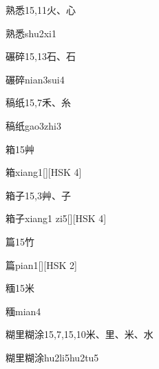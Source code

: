 \begin{entry}{熟悉}{15,11}{⽕、⼼}
  \begin{phonetics}{熟悉}{shu2xi1}
  \end{phonetics}
\end{entry}

\begin{entry}{碾碎}{15,13}{⽯、⽯}
  \begin{phonetics}{碾碎}{nian3sui4}
  \end{phonetics}
\end{entry}

\begin{entry}{稿纸}{15,7}{⽲、⽷}
  \begin{phonetics}{稿纸}{gao3zhi3}
  \end{phonetics}
\end{entry}

\begin{entry}{箱}{15}{⾋}
  \begin{phonetics}{箱}{xiang1}[][HSK 4]
  \end{phonetics}
\end{entry}

\begin{entry}{箱子}{15,3}{⾋、⼦}
  \begin{phonetics}{箱子}{xiang1 zi5}[][HSK 4]
  \end{phonetics}
\end{entry}

\begin{entry}{篇}{15}{⽵}
  \begin{phonetics}{篇}{pian1}[][HSK 2]
  \end{phonetics}
\end{entry}

\begin{entry}{糆}{15}{⽶}
  \begin{phonetics}{糆}{mian4}
  \end{phonetics}
\end{entry}

\begin{entry}{糊里糊涂}{15,7,15,10}{⽶、⾥、⽶、⽔}
  \begin{phonetics}{糊里糊涂}{hu2li5hu2tu5}
  \end{phonetics}
\end{entry}

